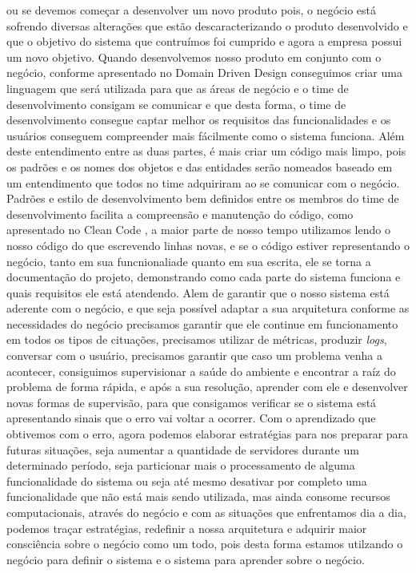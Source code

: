   ou se devemos começar a desenvolver um novo produto pois, o negócio está
  sofrendo diversas alterações que estão descaracterizando o produto desenvolvido
  e que o objetivo do sistema que contruímos foi cumprido e agora a empresa possui
  um novo objetivo. \newline
  Quando desenvolvemos nosso produto em conjunto com o negócio, conforme apresentado
  no Domain Driven Design \cite{DomainDrivenDesign} conseguimos criar uma linguagem
  que será utilizada para que as áreas de negócio e o time de desenvolvimento
  consigam se comunicar e que desta forma, o time de desenvolvimento consegue
  captar melhor os requisitos das funcionalidades e os usuários conseguem
  compreender mais fácilmente como o sistema funciona. Além deste entendimento
  entre as duas partes, é mais criar um código mais limpo, pois os padrões e os
  nomes dos objetos e das entidades serão nomeados baseado em um entendimento
  que todos no time adquiriram ao se comunicar com o negócio. Padrões e estilo de
  desenvolvimento bem definidos entre os membros do time de desenvolvimento facilita
  a compreensão e manutenção do código, como apresentado no Clean Code \cite{CleanCode},
  a maior parte de nosso tempo utilizamos lendo o nosso código do que escrevendo
  linhas novas, e se o código estiver representando o negócio, tanto em sua
  funcnionaliade quanto em sua escrita, ele se torna a documentação do projeto,
  demonstrando como cada parte do sistema funciona e quais requisitos ele está
  atendendo. \newline
  Alem de garantir que o nosso sistema está aderente com o negócio, e que seja
  possível adaptar a sua arquitetura conforme as necessidades do negócio precisamos
  garantir que ele continue em funcionamento em todos os tipos de cituações,
  precisamos utilizar de métricas, produzir \textit{logs}, conversar com o usuário,
  precisamos garantir que caso um problema venha a acontecer, consiguimos supervisionar
  a saúde do ambiente e encontrar a raíz do problema de forma rápida, e após a
  sua resolução, aprender com ele e desenvolver novas formas de supervisão, para
  que consigamos verificar se o sistema está apresentando sinais que o erro vai
  voltar a ocorrer. Com o aprendizado que obtivemos com o erro, agora podemos
  elaborar estratégias para nos preparar para futuras situações, seja aumentar
  a quantidade de servidores durante um determinado período, seja particionar
  mais o processamento de alguma funcionalidade do sistema ou seja até mesmo
  desativar por completo uma funcionalidade que não está mais sendo utilizada,
  mas ainda consome recursos computacionais, através do negócio e com as situações
  que enfrentamos dia a dia, podemos traçar estratégias, redefinir a nossa
  arquitetura e adquirir maior consciência sobre o negócio como um todo, pois
  desta forma estamos utilzando o negócio para definir o sistema e o sistema
  para aprender sobre o negócio.
